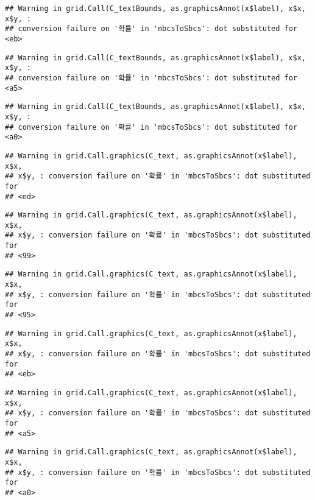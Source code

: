 \documentclass[]{book}
\begin{document}
\begin{verbatim}
## Warning in grid.Call(C_textBounds, as.graphicsAnnot(x$label), x$x, x$y, :
## conversion failure on '확률' in 'mbcsToSbcs': dot substituted for <eb>
\end{verbatim}

\begin{verbatim}
## Warning in grid.Call(C_textBounds, as.graphicsAnnot(x$label), x$x, x$y, :
## conversion failure on '확률' in 'mbcsToSbcs': dot substituted for <a5>
\end{verbatim}

\begin{verbatim}
## Warning in grid.Call(C_textBounds, as.graphicsAnnot(x$label), x$x, x$y, :
## conversion failure on '확률' in 'mbcsToSbcs': dot substituted for <a0>
\end{verbatim}

\begin{verbatim}
## Warning in grid.Call.graphics(C_text, as.graphicsAnnot(x$label), x$x,
## x$y, : conversion failure on '확률' in 'mbcsToSbcs': dot substituted for
## <ed>
\end{verbatim}

\begin{verbatim}
## Warning in grid.Call.graphics(C_text, as.graphicsAnnot(x$label), x$x,
## x$y, : conversion failure on '확률' in 'mbcsToSbcs': dot substituted for
## <99>
\end{verbatim}

\begin{verbatim}
## Warning in grid.Call.graphics(C_text, as.graphicsAnnot(x$label), x$x,
## x$y, : conversion failure on '확률' in 'mbcsToSbcs': dot substituted for
## <95>
\end{verbatim}

\begin{verbatim}
## Warning in grid.Call.graphics(C_text, as.graphicsAnnot(x$label), x$x,
## x$y, : conversion failure on '확률' in 'mbcsToSbcs': dot substituted for
## <eb>
\end{verbatim}

\begin{verbatim}
## Warning in grid.Call.graphics(C_text, as.graphicsAnnot(x$label), x$x,
## x$y, : conversion failure on '확률' in 'mbcsToSbcs': dot substituted for
## <a5>
\end{verbatim}

\begin{verbatim}
## Warning in grid.Call.graphics(C_text, as.graphicsAnnot(x$label), x$x,
## x$y, : conversion failure on '확률' in 'mbcsToSbcs': dot substituted for
## <a0>
\end{verbatim}
\end{document}
